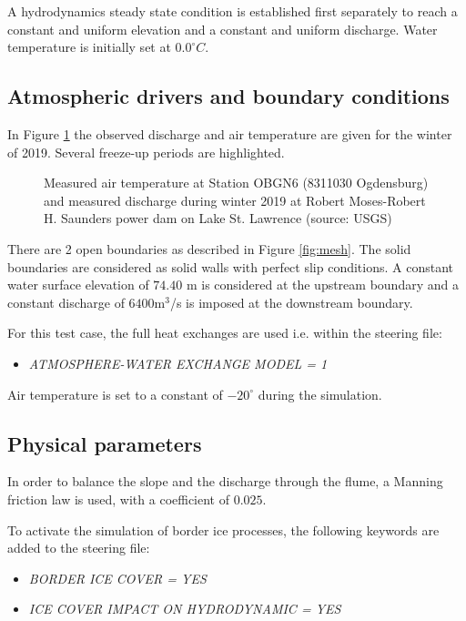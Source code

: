 A hydrodynamics steady state condition is established first separately to reach a constant and uniform elevation and a constant and uniform discharge.
Water temperature is initially set at $0.0^\circ C$.

\subsection{Atmospheric drivers and boundary conditions}

In Figure \ref{fig:mto_data} the observed discharge and air temperature are given for the winter of 2019.
Several freeze-up periods are highlighted.

\begin{figure}[H]
    \begin{center}
    \end{center}
    \caption{Measured air temperature at Station OBGN6 (8311030 Ogdensburg) and measured discharge during winter 2019 at Robert Moses-Robert H. Saunders power dam on Lake St. Lawrence (source: USGS)}
    \label{fig:mto_data}
\end{figure}

There are 2 open boundaries as described in Figure \ref{fig:mesh}.
The solid boundaries are considered as solid walls with perfect slip conditions.
A constant water surface elevation of $74.40$ m is considered at the upstream  boundary
and a constant discharge of $6400$m$^3$/s is imposed at the downstream boundary.

For this test case, the full heat exchanges are used i.e. within the \khione steering file:
\begin{itemize}
	\item\textit{ATMOSPHERE-WATER EXCHANGE MODEL = 1}
\end{itemize}
Air temperature is set to a constant of $-20^{\circ}$ during the simulation.

\subsection{Physical parameters}

In order to balance the slope and the discharge through the flume, a Manning friction law is used, with a coefficient of $0.025$.

To activate the simulation of border ice processes, the following keywords are added to the \khione steering file:
\begin{itemize}
	\item\textit{BORDER ICE COVER = YES}
  \item\textit{ICE COVER IMPACT ON HYDRODYNAMIC = YES}
\end{itemize}


